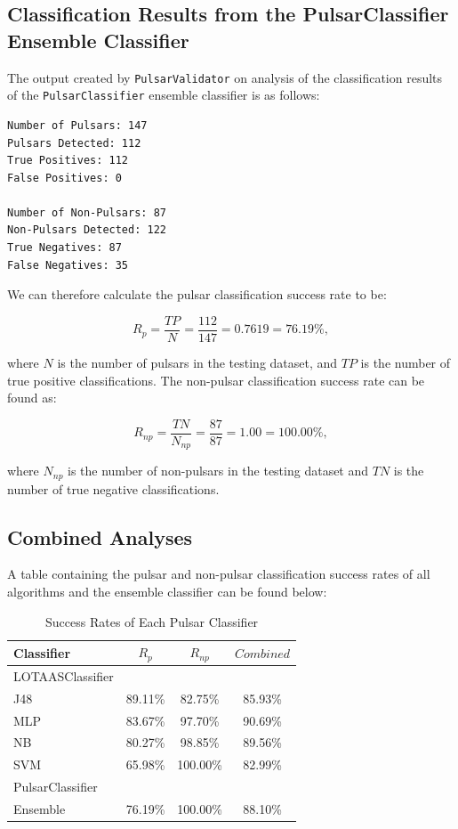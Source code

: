 \documentclass{article}
\begin{document}
\subsection{Classification Results from the PulsarClassifier Ensemble Classifier}

The output created by \verb|PulsarValidator| on analysis of the classification results of the \verb|PulsarClassifier| ensemble classifier is as follows:

\begin{lstlisting}[numbers=none]
Number of Pulsars: 147
Pulsars Detected: 112
True Positives: 112
False Positives: 0

Number of Non-Pulsars: 87
Non-Pulsars Detected: 122
True Negatives: 87
False Negatives: 35
\end{lstlisting}

We can therefore calculate the pulsar classification success rate to be:

$$ R_{p} = \frac{TP}{N} = \frac{112}{147} =  0.7619 = 76.19\%,$$

where $N$ is the number of pulsars in the testing dataset, and $TP$ is the number of true positive classifications. The non-pulsar classification success rate can be found as:

$$R_{np} = \frac{TN}{N_{np}} = \frac{87}{87} = 1.00 = 100.00\%,$$

where $N_{np}$ is the number of non-pulsars in the testing dataset and $TN$ is the number of true negative classifications.

\subsection{Combined Analyses}

A table containing the pulsar and non-pulsar classification success rates of all algorithms and the ensemble classifier can be found below:

\begin{table}[H]
    \centering
    
    \caption{Success Rates of Each Pulsar Classifier}

    \begin{framed}
        \begin{tabular}{l c c c}
            Classifier & $R_p$ & $R_{np}$ & $Combined$ \\
            \hline
            \hline
            LOTAASClassifier &  &  & \\
            \hline
            J48 & 89.11\% & 82.75\% & 85.93\% \\
            MLP & 83.67\% & 97.70\% & 90.69\% \\
            NB & 80.27\% & 98.85\% & 89.56\%\\
            SVM & 65.98\% & 100.00\% & 82.99\% \\
            \hline
            PulsarClassifier &  &  & \\
            \hline
            Ensemble & 76.19\% & 100.00\% & 88.10\% \\
        \end{tabular}
    \end{framed}
    \label{tab:analyses}
\end{table}
\end{document}
